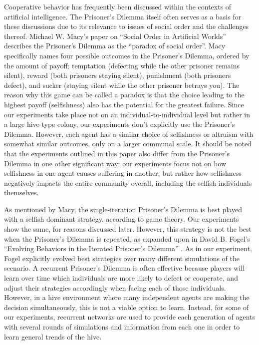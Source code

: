\documentclass[11pt]{article}
\begin{document}
		Cooperative behavior has frequently been discussed within the contexts of artificial intelligence. The Prisoner's Dilemma itself often serves as a basis for these discussions due to its relevance to issues of social order and the challenges thereof. Michael W. Macy's paper on ``Social Order in Artificial Worlds'' describes the Prisoner's Dilemma as the ``paradox of social order''. \cite{macy} Macy specifically names four possible outcomes in the Prisoner's Dilemma, ordered by the amount of payoff: temptation (defecting while the other prisoner remains silent), reward (both prisoners staying silent), punishment (both prisoners defect), and sucker (staying silent while the other prisoner betrays you). The reason why this game can be called a paradox is that the choice leading to the highest payoff (selfishness) also has the potential for the greatest failure. Since our experiments take place not on an individual-to-individual level but rather in a large hive-type colony, our experiments don't explicitly use the Prisoner's Dilemma. However, each agent has a similar choice of selfishness or altruism with somewhat similar outcomes, only on a larger communal scale. It should be noted that the experiments outlined in this paper also differ from the Prisoner's Dilemma in one other significant way: our experiments focus not on how selfishness in one agent causes suffering in another, but rather how selfishness negatively impacts the entire community overall, including the selfish individuals themselves.

		As mentioned by Macy, the single-iteration Prisoner's Dilemma is best played with a selfish dominant strategy, according to game theory. Our experiments show the same, for reasons discussed later. However, this strategy is not the best when the Prisoner's Dilemma is repeated, as expanded upon in David B. Fogel's ``Evolving Behaviors in the Iterated Prisoner's Dilemma'' \cite{fogel}. As in our experiment, Fogel explicitly evolved best strategies over many different simulations of the scenario. A recurrent Prisoner's Dilemma is often effective because players will learn over time which individuals are more likely to defect or cooperate, and adjust their strategies accordingly when facing each of those individuals. However, in a hive environment where many independent agents are making the decision simultaneously, this is not a viable option to learn. Instead, for some of our experiments, recurrent networks are used to provide each generation of agents with several rounds of simulations and information from each one in order to learn general trends of the hive.
\end{document}
